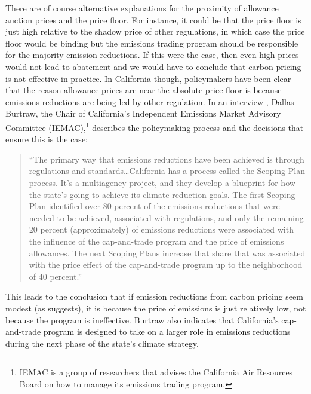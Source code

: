 There are of course alternative explanations for the proximity of allowance auction prices and the price floor. For instance, it could be that the price floor is just high relative to the shadow price of other regulations, in which case the price floor would be binding but the emissions trading program should be responsible for the majority emission reductions. If this were the case, then even high prices would not lead to abatement and we would have to conclude that carbon pricing is not effective in practice. In California though, policymakers have been clear that the reason allowance prices are near the absolute price floor is because emissions reductions are being led by other regulation. In an interview \citep{burtraw2022_rff}, Dallas Burtraw, the Chair of California's Independent Emissions Market Advisory Committee (IEMAC),\footnote{IEMAC is a group of researchers that advises the California Air Resources Board on how to manage its emissions trading program.} describes the policymaking process and the decisions that ensure this is the case:
\begin{quote}
	``The primary way that emissions reductions have been achieved is through regulations and standards\ldots California has a process called the Scoping Plan process. It's a multiagency project, and they develop a blueprint for how the state's going to achieve its climate reduction goals. The first Scoping Plan identified over 80 percent of the emissions reductions that were needed to be achieved, associated with regulations, and only the remaining 20 percent (approximately) of emissions reductions were associated with the influence of the cap-and-trade program and the price of emissions allowances. The next Scoping Plans increase that share that was associated with the price effect of the cap-and-trade program up to the neighborhood of 40 percent.''
\end{quote}
This leads to the conclusion that if emission reductions from carbon pricing seem modest (as \cite{green2021does} suggests), it is because the price of emissions is just relatively low, not because the program is ineffective. Burtraw also indicates that California's cap-and-trade program is designed to take on a larger role in emissions reductions during the next phase of the state's climate strategy.

